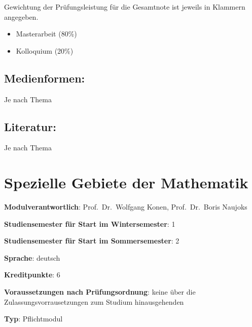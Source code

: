 Gewichtung der Prüfungsleistung für die Gesamtnote ist jeweils in
Klammern angegeben.

\begin{itemize}
\tightlist
\item
  Masterarbeit (80\%)
\item
  Kolloquium (20\%)
\end{itemize}

\section*{Medienformen:\label{/mi-2017/modulbeschreibungen-master/MA_All_Modul_Masterarbeit}}\label{medienformenpathlabelmi-2017modulbeschreibungen-mastermaux5fallux5fmodulux5fmasterarbeit}

Je nach Thema

\section*{Literatur:\label{/mi-2017/modulbeschreibungen-master/MA_All_Modul_Masterarbeit}}\label{literaturpathlabelmi-2017modulbeschreibungen-mastermaux5fallux5fmodulux5fmasterarbeit}

Je nach Thema

\chapter{Spezielle Gebiete der
Mathematik\label{/mi-2017/modulbeschreibungen-master/MA_All_Modul_Mathematik}}\label{spezielle-gebiete-der-mathematikpathlabelmi-2017modulbeschreibungen-mastermaux5fallux5fmodulux5fmathematik}

\begin{modulHead}
\textbf{Modulverantwortlich}: Prof.~Dr.~Wolfgang
Konen, Prof.~Dr.~Boris
Naujoks
\end{modulHead}
\begin{modulHead}
\textbf{Studiensemester für
Start im Wintersemester}:
1
\end{modulHead}
\begin{modulHead}
\textbf{Studiensemester für Start
im Sommersemester}:
2
\end{modulHead}
\begin{modulHead}
\textbf{Sprache}:
deutsch
\end{modulHead}
\begin{modulHead}
\textbf{Kreditpunkte}:
6
\end{modulHead}
\begin{modulHead}
\textbf{Voraussetzungen nach
Prüfungsordnung}: keine über die Zulassungsvorrausetzungen zum Studium
hinausgehenden
\end{modulHead}
\begin{modulHead}
\textbf{Typ}:
Pflichtmodul
\end{modulHead}



